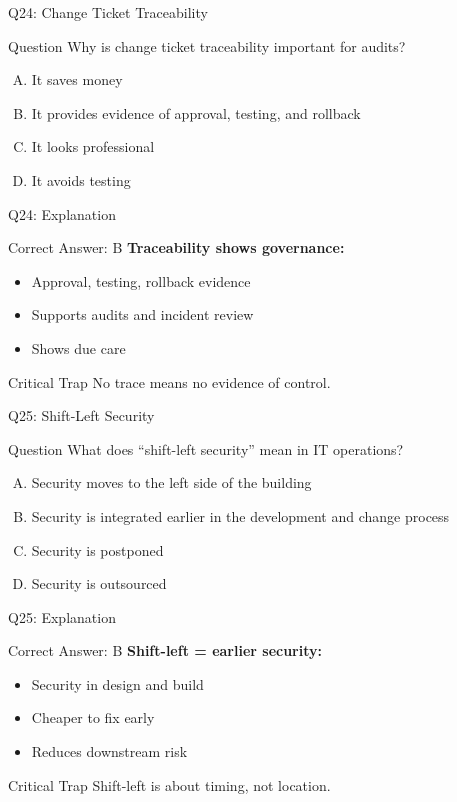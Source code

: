 \documentclass{beamer}
\begin{document}
	\begin{frame}{Q24: Change Ticket Traceability}
		\begin{block}{Question}
			Why is change ticket traceability important for audits?
		\end{block}
		\begin{enumerate}[(A)]
			\item It saves money
			\item It provides evidence of approval, testing, and rollback
			\item It looks professional
			\item It avoids testing
		\end{enumerate}
	\end{frame}
	
	\begin{frame}{Q24: Explanation}
		\begin{block}{Correct Answer: B}
			\textbf{Traceability shows governance:}
			\begin{itemize}
				\item Approval, testing, rollback evidence
				\item Supports audits and incident review
				\item Shows due care
			\end{itemize}
		\end{block}
		\begin{alertblock}{Critical Trap}
			No trace means no evidence of control.
		\end{alertblock}
	\end{frame}
	
	\begin{frame}{Q25: Shift-Left Security}
		\begin{block}{Question}
			What does ``shift-left security'' mean in IT operations?
		\end{block}
		\begin{enumerate}[(A)]
			\item Security moves to the left side of the building
			\item Security is integrated earlier in the development and change process
			\item Security is postponed
			\item Security is outsourced
		\end{enumerate}
	\end{frame}
	
	\begin{frame}{Q25: Explanation}
		\begin{block}{Correct Answer: B}
			\textbf{Shift-left = earlier security:}
			\begin{itemize}
				\item Security in design and build
				\item Cheaper to fix early
				\item Reduces downstream risk
			\end{itemize}
		\end{block}
		\begin{alertblock}{Critical Trap}
			Shift-left is about timing, not location.
		\end{alertblock}
	\end{frame}
	
\end{document}
